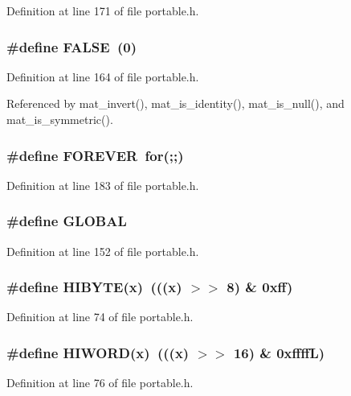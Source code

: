 Definition at line 171 of file portable.h.
\subsubsection{\setlength{\rightskip}{0pt plus 5cm}\#define FALSE\ (0)}\label{portable_8h_a59}




Definition at line 164 of file portable.h.

Referenced by mat\_\-invert(), mat\_\-is\_\-identity(), mat\_\-is\_\-null(), and mat\_\-is\_\-symmetric().
\subsubsection{\setlength{\rightskip}{0pt plus 5cm}\#define FOREVER\ for(;;)}\label{portable_8h_a70}




Definition at line 183 of file portable.h.
\subsubsection{\setlength{\rightskip}{0pt plus 5cm}\#define GLOBAL}\label{portable_8h_a57}




Definition at line 152 of file portable.h.
\subsubsection{\setlength{\rightskip}{0pt plus 5cm}\#define HIBYTE(x)\ (((x) $>$$>$ 8) \& 0xff)}\label{portable_8h_a2}




Definition at line 74 of file portable.h.
\subsubsection{\setlength{\rightskip}{0pt plus 5cm}\#define HIWORD(x)\ (((x) $>$$>$ 16) \& 0xffff\-L)}\label{portable_8h_a4}




Definition at line 76 of file portable.h.
